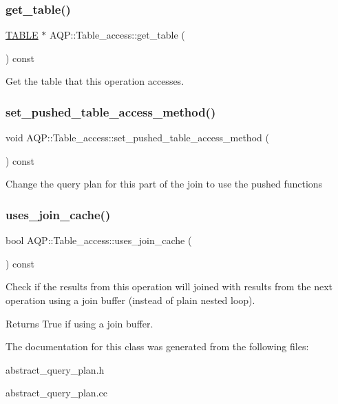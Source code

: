 \subsubsection{\texorpdfstring{get\+\_\+table()}{get\_table()}}
{\footnotesize\ttfamily \mbox{\hyperlink{structTABLE}{T\+A\+B\+LE}} $\ast$ A\+Q\+P\+::\+Table\+\_\+access\+::get\+\_\+table (\begin{DoxyParamCaption}{ }\end{DoxyParamCaption}) const}

Get the table that this operation accesses. \mbox{\label{classAQP_1_1Table__access_a0c2933d26dabe26c0f07025f81ec21c3}} 
\subsubsection{\texorpdfstring{set\+\_\+pushed\+\_\+table\+\_\+access\+\_\+method()}{set\_pushed\_table\_access\_method()}}
{\footnotesize\ttfamily void A\+Q\+P\+::\+Table\+\_\+access\+::set\+\_\+pushed\+\_\+table\+\_\+access\+\_\+method (\begin{DoxyParamCaption}{ }\end{DoxyParamCaption}) const}

Change the query plan for this part of the join to use the pushed functions \mbox{\label{classAQP_1_1Table__access_a40d58fab243f6b31a9250f697995c783}} 
\subsubsection{\texorpdfstring{uses\+\_\+join\+\_\+cache()}{uses\_join\_cache()}}
{\footnotesize\ttfamily bool A\+Q\+P\+::\+Table\+\_\+access\+::uses\+\_\+join\+\_\+cache (\begin{DoxyParamCaption}{ }\end{DoxyParamCaption}) const}

Check if the results from this operation will joined with results from the next operation using a join buffer (instead of plain nested loop). \begin{DoxyReturn}{Returns}
True if using a join buffer. 
\end{DoxyReturn}


The documentation for this class was generated from the following files\+:\begin{DoxyCompactItemize}
\item 
abstract\+\_\+query\+\_\+plan.\+h\item 
abstract\+\_\+query\+\_\+plan.\+cc\end{DoxyCompactItemize}
